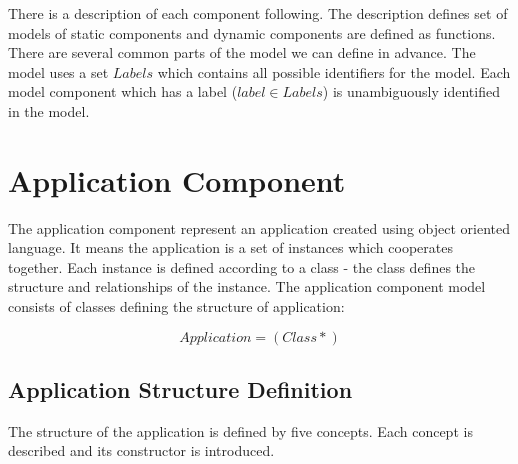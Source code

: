 \documentclass[11pt]{article}
\begin{document}
There is a description of each component following. The description defines set of models of static components and dynamic components are defined as functions. There are several common parts of the model we can define in advance. The model uses a set $Labels$ which contains all possible identifiers for the model. Each model component which has a label ($label \in Labels$) is unambiguously identified in the model.


\section{Application Component}
The application component represent an application created using object oriented language. It means the application is a set of instances which cooperates together. Each instance is defined according to a class - the class defines the structure and relationships of the instance. 
The application component model consists of  classes defining the structure of application:
 
$$
Application = (Class*)
$$



\subsection{Application Structure Definition}
The structure of the application is defined by five concepts. Each concept is described and its constructor is introduced.
\end{document}
